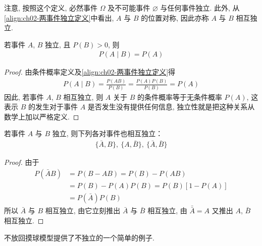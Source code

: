 \documentclass[../../main.tex]{subfiles}
\begin{document}
注意, 按照这个定义, 必然事件 $\Omega$ 及不可能事件 $\varnothing$ 与任何事件独立. 此外, 从\eqref{align:ch02-两事件独立定义}中看出, $A$ 与 $B$ 的位置对称, 因此亦称 $A$ 与 $B$ 相互独立.

\begin{corollary}[独立事件的条件概率]\label{corollary:ch02-独立事件条件概率}
若事件 $A$, $B$ 独立, 且 $P(B)>0$, 则
\begin{align}\label{align:ch02-独立事件条件概率}
P(A\mid B)=P(A)
\end{align}

\begin{proof}
由条件概率定义及\eqref{align:ch02-两事件独立定义}得
\begin{align*}
P(A\mid B)=\frac{P(AB)}{P(B)}=\frac{P(A)P(B)}{P(B)}=P(A)
\end{align*}
因此, 若事件 $A$, $B$ 相互独立, 则 $A$ 关于 $B$ 的条件概率等于无条件概率 $P(A)$, 这表示 $B$ 的发生对于事件 $A$ 是否发生没有提供任何信息, 独立性就是把这种关系从数学上加以严格定义.
\end{proof}
\end{corollary}

\begin{corollary}[独立事件的补运算]\label{corollary:ch02-独立事件补运算}
若事件 $A$ 与 $B$ 独立, 则下列各对事件也相互独立：
\begin{align*}
\{\bar{A},B\},\ \{A,\bar{B}\},\ \{\bar{A},\bar{B}\}
\end{align*}

\begin{proof}
由于
\begin{align*}
P(\bar{A}B)&=P(B-AB)=P(B)-P(AB)\\
&=P(B)-P(A)P(B)=P(B)[1-P(A)]\\
&=P(\bar{A})P(B)
\end{align*}
所以 $\bar{A}$ 与 $B$ 相互独立, 由它立刻推出 $\bar{A}$ 与 $\bar{B}$ 相互独立, 由 $\bar{\bar{A}}=A$ 又推出 $A$, $\bar{B}$ 相互独立.
\end{proof}
\end{corollary}

不放回摸球模型提供了不独立的一个简单的例子.
\end{document}
